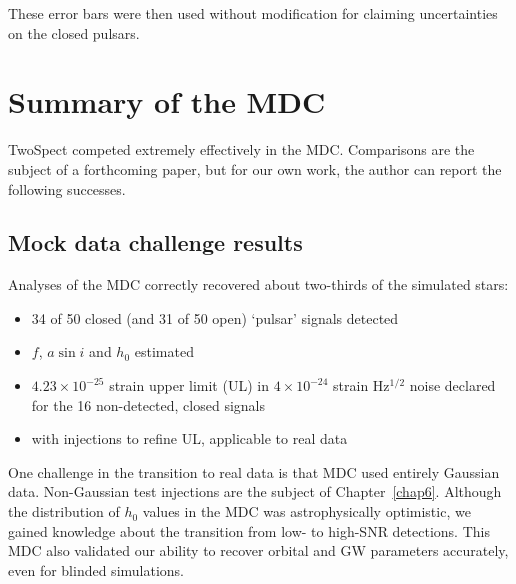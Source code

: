 These error bars were then used without modification for claiming uncertainties on the closed pulsars.



\section{Summary of the MDC}

TwoSpect competed extremely effectively in the MDC.
Comparisons are the subject of a forthcoming paper, but for our own work, the author can report the following successes.

\subsection{Mock data challenge results}

Analyses of the MDC correctly recovered about two-thirds of the simulated stars:

\begin{itemize}
\item 34 of 50 closed (and 31 of 50 open) `pulsar' signals detected
\item $f$, $a \sin i$ and $h_0$ estimated
\item $4.23\times 10^{-25}$ strain upper limit (UL) in $4 \times 10^{-24}$ strain Hz$^{1/2}$ noise declared for the 16 non-detected, closed signals
\item with injections to refine UL, applicable to real data
\end{itemize}

One challenge in the transition to real data is that MDC used entirely Gaussian data.
Non-Gaussian test injections are the subject of Chapter~\ref{chap6}.
Although the distribution of $h_0$ values in the MDC was astrophysically optimistic, we gained knowledge about the transition from low- to high-SNR detections.
This MDC also validated our ability to recover orbital and GW parameters accurately, even for blinded simulations.

